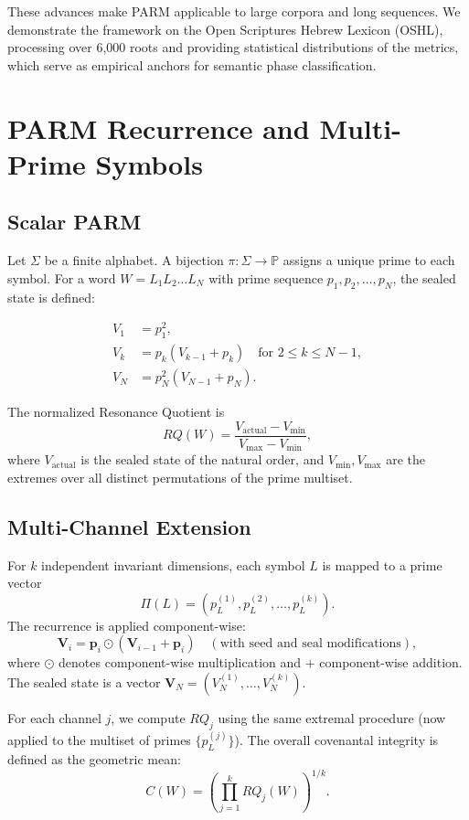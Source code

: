 \documentclass[12pt]{article}
\theoremstyle{plain}
\theoremstyle{definition}
\theoremstyle{remark}
\begin{document}
These advances make PARM applicable to large corpora and long sequences. We demonstrate the framework on the Open Scriptures Hebrew Lexicon (OSHL), processing over 6,000 roots and providing statistical distributions of the metrics, which serve as empirical anchors for semantic phase classification.

\section{PARM Recurrence and Multi-Prime Symbols}

\subsection{Scalar PARM}

Let $\Sigma$ be a finite alphabet. A bijection $\pi: \Sigma \to \mathbb{P}$ assigns a unique prime to each symbol. For a word $W = L_1 L_2 \dots L_N$ with prime sequence $p_1, p_2, \dots, p_N$, the sealed state is defined:

\[
\begin{aligned}
V_1 &= p_1^2, \\
V_k &= p_k (V_{k-1} + p_k) \quad \text{for } 2 \le k \le N-1, \\
V_N &= p_N^2 (V_{N-1} + p_N).
\end{aligned}
\]

The normalized Resonance Quotient is
\[
RQ(W) = \frac{V_{\text{actual}} - V_{\min}}{V_{\max} - V_{\min}},
\]
where $V_{\text{actual}}$ is the sealed state of the natural order, and $V_{\min}, V_{\max}$ are the extremes over all distinct permutations of the prime multiset.

\subsection{Multi-Channel Extension}

For $k$ independent invariant dimensions, each symbol $L$ is mapped to a prime vector
\[
\Pi(L) = (p^{(1)}_L, p^{(2)}_L, \dots, p^{(k)}_L).
\]
The recurrence is applied component-wise:
\[
\mathbf{V}_i = \mathbf{p}_i \odot (\mathbf{V}_{i-1} + \mathbf{p}_i) \quad (\text{with seed and seal modifications}),
\]
where $\odot$ denotes component-wise multiplication and $+$ component-wise addition. The sealed state is a vector $\mathbf{V}_N = (V_N^{(1)}, \dots, V_N^{(k)})$.

For each channel $j$, we compute $RQ_j$ using the same extremal procedure (now applied to the multiset of primes $\{p^{(j)}_L\}$). The overall covenantal integrity is defined as the geometric mean:
\[
C(W) = \left(\prod_{j=1}^k RQ_j(W)\right)^{1/k}.
\]
\end{document}
